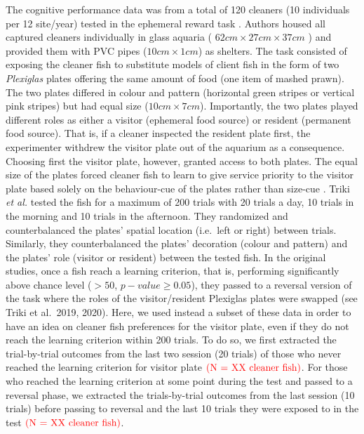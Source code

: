 \documentclass[]{rsos}%
\begin{document}
The cognitive performance data was from a total of 120 cleaners
(10 individuals per 12 site/year) tested in the
ephemeral reward task \citep{triki_Biological_2019, triki_Brain_2020}. Authors
housed all captured cleaners individually in glass aquaria
( \(62cm \times 27cm \times 37 cm\) ) and provided them
with PVC pipes (\(10 cm \times 1 cm\)) as shelters.
The task consisted of exposing the cleaner fish to substitute
models of client fish in the form of two \emph{Plexiglas} plates offering the
same amount of food (one item of mashed prawn). The two plates differed
in colour and pattern (horizontal green stripes or vertical pink stripes)
but had equal size (\(10 cm \times 7 cm\)). Importantly, the two plates played
different roles as either a visitor (ephemeral food source) or
resident (permanent food source). That is, if a cleaner inspected the
resident plate first, the experimenter withdrew the visitor plate out of
the aquarium as a consequence. Choosing first the visitor plate,
however, granted access to both plates. The equal size of the plates
forced cleaner fish to learn to give service priority to the visitor plate
based solely on the behaviour-cue of the plates rather than size-cue
\citep{wismer_Cuebased_2019}. Triki \emph{et al.} \citep{triki_Biological_2019, triki_Brain_2020}
tested the fish for a maximum of 200 trials with 20 trials a day, 10 trials
in the morning and 10 trials in the afternoon. They randomized and
counterbalanced the plates' spatial location (i.e.~left or right)
between trials. Similarly, they counterbalanced the plates' decoration
(colour and pattern) and the plates' role (visitor or resident) between the
tested fish. In the original studies, once a fish reach a learning criterion,
that is, performing significantly above chance level (\(> 50%
\), \(p-value ≥ 0.05\)),
they passed to a reversal version of the task where the roles of the
visitor/resident Plexiglas plates were swapped (see Triki et al.~2019, 2020).
Here, we used instead a subset of these data in order to have an idea on
cleaner fish preferences for the visitor plate, even if they do not reach
the learning criterion within 200 trials. To do so, we first extracted the
trial-by-trial outcomes from the last two session (20 trials) of those who
never reached the learning criterion for visitor plate
\(\color{red}{\text{(N = XX cleaner fish)}}\).
For those who reached the learning criterion at some point during the
test and passed to a reversal phase, we extracted the trials-by-trial
outcomes from the last session (10 trials) before passing to reversal
and the last 10 trials they were exposed to in the test
\(\color{red}{\text{(N = XX cleaner fish)}}\).
\end{document}
